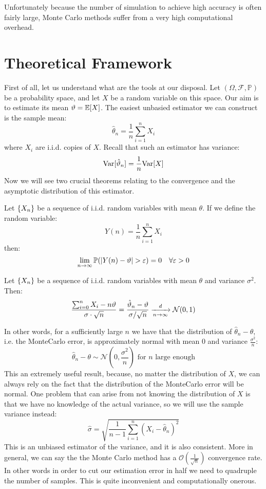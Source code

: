 Unfortunately because the number of simulation to achieve high accuracy is
often fairly large, Monte Carlo methods suffer from a very high computational
overhead.

\section{Theoretical Framework}

First of all, let us understand what are the tools at our disposal.
Let $(\Omega, \mathcal{F}, \mathbb{P})$ be a probability space, and let $X$
be a random variable on this space. Our aim is to estimate its mean $\theta = 
\E[X]$. The easiest unbasied estimator we can construct is the sample mean:
\[ \hat{\theta}_n = \frac{1}{n} \sum_{i=1}^n X_i \]
where $X_i$ are i.i.d. copies of $X$.
Recall that such an estimator has variance:
\[ \Var[\hat{\theta}_n] = \frac{1}{n} \Var[X] \]
Now we will see two crucial theorems relating to the convergence and the
asymptotic distribution of this estimator.

\begin{theorem*}
Let $\seq{X}$ be a sequence of i.i.d. random variables with mean $\theta$.
If we define the random variable:
\[ Y(n) = \frac{1}{n} \sum_{i=1}^n X_i \]
then:
\[ \lim_{n\to\infty} \P(|Y(n) - \theta| > \epsilon) = 0 \quad \forall \epsilon
> 0 \]
\end{theorem*}

\begin{theorem*}
Let $\seq{X}$ be a sequence of i.i.d. random variables with mean $\theta$ and
variance $\sigma^2$. Then:
\[ \frac{\sum_{i=0}^n X_i - n\theta}{\sigma\cdot\sqrt{n}} = \frac{\hat{\theta}_n
- \theta}{\sigma / \sqrt{n}} \toin{d} \mathcal{N}(0,1) \]
\end{theorem*}

In other words, for a sufficiently large $n$ we have that the distribution of
$\hat{\theta}_n - \theta$, i.e. the MonteCarlo error, is approximately normal
with mean $0$ and variance $\frac{\sigma^2}{n}$:
\[ \hat{\theta}_n - \theta \sim \mathcal{N}\left(0, \frac{\sigma^2}{n}\right) 
\text{ for } n \text{ large enough}\]
This an extremely useful result, because, no matter the distribution of $X$,
we can always rely on the fact that the distribution of the MonteCarlo error
will be normal.
One problem that can arise from not knowing the distribution of $X$ is that we
have no knowledge of the actual variance, so we will use the sample variance
instead:
\[ \hat{\sigma} = \sqrt{\frac{1}{n-1} \sum_{i=1}^n (X_i - \hat{\theta}_n)^2}\]
This is an unbiased estimator of the variance, and it is also consistent.
More in general, we can say the the Monte Carlo method has a
$\mathcal{O}\left(\frac{1}{\sqrt{n}}\right)$ convergence rate.
In other words in order to cut our estimation error in half we need to 
quadruple the number of samples. This is quite inconvenient and computationally
onerous.

